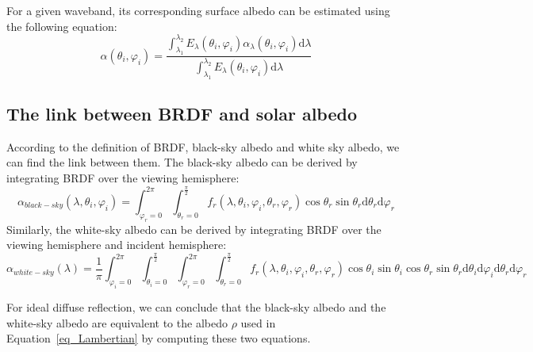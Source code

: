 For a given waveband, its corresponding surface albedo can be estimated using the following equation:
\begin{equation}
    \label{eq_albedo_broadband}
    \alpha(\theta_i, \varphi_i) = \frac{\int_{\lambda_1}^{\lambda_2} E_\lambda(\theta_i, \varphi_i) \alpha_\lambda(\theta_i, \varphi_i) \mathrm{d}\lambda}{\int_{\lambda_1}^{\lambda_2} E_\lambda(\theta_i, \varphi_i) \mathrm{d}\lambda}
\end{equation}

\subsection{The link between BRDF and solar albedo}
According to the definition of BRDF, black-sky albedo and white sky albedo, we can find the link between them.
The black-sky albedo can be derived by integrating BRDF over the viewing hemisphere:
\begin{equation}
    \label{eq_brdf_black_albedo}
    \alpha_{black-sky}(\lambda, \theta_i, \varphi_i) = \int_{\varphi_r = 0}^{2\pi} \int_{\theta_r = 0}^{\frac{\pi}{2}} f_r(\lambda, \theta_i,\varphi_i, \theta_r, \varphi_r) \cos\theta_r \sin\theta_r \mathrm{d}\theta_r \mathrm{d}\varphi_r
\end{equation}
Similarly, the white-sky albedo can be derived by integrating BRDF over the viewing hemisphere and incident hemisphere:
\begin{equation}
    \label{eq_brdf_white_albedo}
    \alpha_{white-sky}(\lambda) = \frac{1}{\pi}\int_{\varphi_i = 0}^{2\pi} \int_{\theta_i = 0}^{\frac{\pi}{2}}%
    \int_{\varphi_r = 0}^{2\pi} \int_{\theta_r = 0}^{\frac{\pi}{2}}%
    f_r(\lambda, \theta_i,\varphi_i, \theta_r, \varphi_r) %
    \cos\theta_i \sin\theta_i%
    \cos\theta_r \sin\theta_r%
    \mathrm{d}\theta_i \mathrm{d}\varphi_i \mathrm{d}\theta_r \mathrm{d}\varphi_r
\end{equation}

For ideal diffuse reflection, we can conclude that the black-sky albedo and the white-sky albedo are equivalent to the albedo $\rho$ used in Equation~\ref{eq_Lambertian} by computing these two equations.








